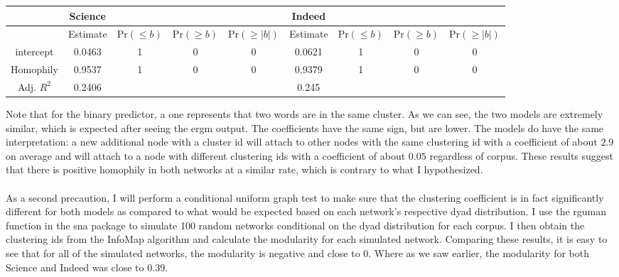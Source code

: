 \documentclass[12pt]{article}
\begin{document}
\vspace{2mm}
\begin{center}
	\begin{tabular}{ |c|c|c|c|c||c|c|c|c|  }
		\hline
		&Science&&&&Indeed&&& \\
		\hline
		&Estimate&Pr$(\le b)$ &Pr$(\ge b)$ &Pr$(\ge |b|)$&Estimate&Pr$(\le b)$ &Pr$(\ge b)$ &Pr$(\ge |b|)$ \\ 
		\hline 
		intercept&0.0463& 1&   0&  0&0.0621& 1&       0&       0      \\
		Homophily&0.9537 &1  &0   &0&0.9379 &1       &0       &0\\
		\hline
		Adj. $R^{2}$&0.2406&&&&0.245&&& \\
		\hline
	\end{tabular}
\end{center}
\vspace{2mm}
Note that for the binary predictor, a one represents that two words are in the same cluster. As we can see, the two models are extremely similar, which is expected after seeing the ergm output. The coefficients have the same sign, but are lower. The models do have the same interpretation:  a new additional node with a cluster id will attach to other nodes with the same clustering id with a coefficient of about $2.9$ on average and will attach to a node with different clustering ids with a coefficient of about $0.05$ regardless of corpus. These results suggest that there is positive homophily in both networks at a similar rate, which is contrary to what I hypothesized.   
\\
\\
As a second precaution, I will perform a conditional uniform graph test to make sure that the clustering coefficient is in fact significantly different for both models as compared to what would be expected based on each network's respective dyad distribution. I use the rguman function in the sna package to simulate 100 random networks conditional on the dyad distribution for each corpus. I then obtain the clustering ids from the InfoMap algorithm and calculate the modularity for each simulated network. Comparing these results, it is easy to see that for all of the simulated networks, the modularity is negative and close to $0$. Where as we saw earlier, the modularity for both Science and Indeed was close to $0.39.$
\vspace{2mm}
\end{document}
